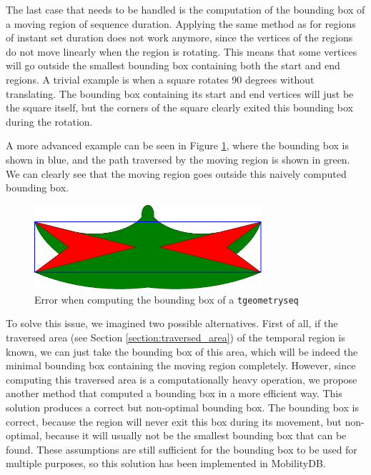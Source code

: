 The last case that needs to be handled is the computation of the bounding box of a moving region of sequence duration. Applying the same method as for regions of instant set duration does not work anymore, since the vertices of the regions do not move linearly when the region is rotating. This means that some vertices will go outside the smallest bounding box containing both the start and end regions. A trivial example is when a square rotates 90 degrees without translating. The bounding box containing its start and end vertices will just be the square itself, but the corners of the square clearly exited this bounding box during the rotation. 

A more advanced example can be seen in Figure \ref{fig:naive_bbox_error}, where the bounding box is shown in blue, and the path traversed by the moving region is shown in green. We can clearly see that the moving region goes outside this naively computed bounding box.

\begin{figure}[h!]
    \centering
    \includegraphics[width=0.75\textwidth]{images/naive_bbox_error.pdf}
    \caption{Error when computing the bounding box of a \lstinline+tgeometryseq+}
    \label{fig:naive_bbox_error}
\end{figure}

To solve this issue, we imagined two possible alternatives. First of all, if the traversed area (see Section \ref{section:traversed_area}) of the temporal region is known, we can just take the bounding box of this area, which will be indeed the minimal bounding box containing the moving region completely. However, since computing this traversed area is a computationally heavy operation, we propose another method that computed a bounding box in a more efficient way. This solution produces a correct but non-optimal bounding box. The bounding box is correct, because the region will never exit this box during its movement, but non-optimal, because it will usually not be the smallest bounding box that can be found. These assumptions are still sufficient for the bounding box to be used for multiple purposes, so this solution has been implemented in MobilityDB.


